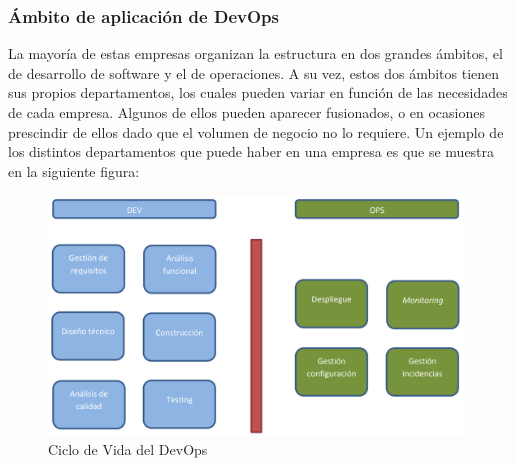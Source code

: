 \documentclass[preprint,12pt]{elsarticle}
\begin{document}
\subsubsection{\textbf{Ámbito de aplicación de DevOps}}
La mayoría de estas empresas organizan la estructura en dos grandes ámbitos, el de desarrollo de software y el de operaciones. A su vez, estos dos ámbitos tienen sus propios departamentos, los cuales pueden variar en función de las necesidades de cada empresa. Algunos de ellos pueden aparecer fusionados, o en
ocasiones prescindir de ellos dado que el volumen de negocio no lo requiere. Un ejemplo de los distintos departamentos que puede haber en una empresa es que se muestra en la siguiente figura: \cite{Jimenez2016}   
\begin{figure}[htb]
	\begin{center}
		\includegraphics[width=11cm]{./IMAGENES/aplicacion_devops} 
		\caption{Ciclo de Vida del DevOps}
	\end{center}
\end{figure}
\end{document}
